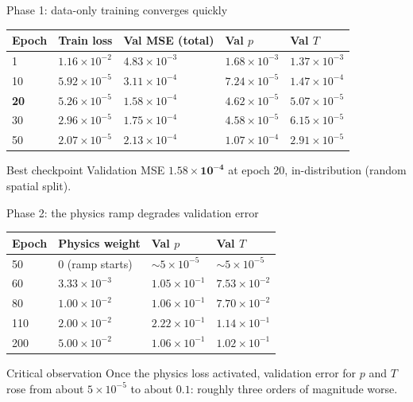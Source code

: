 \documentclass[aspectratio=169]{beamer}
\begin{document}
\begin{frame}{Phase 1: data-only training converges quickly}
\begin{center}
\small
\begin{tabular}{lllll}
\toprule
Epoch & Train loss & Val MSE (total) & Val $p$ & Val $T$ \\
\midrule
1  & $1.16\times10^{-2}$ & $4.83\times10^{-3}$ & $1.68\times10^{-3}$ & $1.37\times10^{-3}$ \\
10 & $5.92\times10^{-5}$ & $3.11\times10^{-4}$ & $7.24\times10^{-5}$ & $1.47\times10^{-4}$ \\
\textbf{20} & \textbf{$5.26\times10^{-5}$} & \textbf{$1.58\times10^{-4}$} & \textbf{$4.62\times10^{-5}$} & \textbf{$5.07\times10^{-5}$} \\
30 & $2.96\times10^{-5}$ & $1.75\times10^{-4}$ & $4.58\times10^{-5}$ & $6.15\times10^{-5}$ \\
50 & $2.07\times10^{-5}$ & $2.13\times10^{-4}$ & $1.07\times10^{-4}$ & $2.91\times10^{-5}$ \\
\bottomrule
\end{tabular}
\end{center}
\vspace{0.2cm}
\begin{block}{Best checkpoint}
Validation MSE $\mathbf{1.58\times10^{-4}}$ at epoch 20, in-distribution (random spatial split).
\end{block}
\end{frame}

\begin{frame}{Phase 2: the physics ramp degrades validation error}
\begin{center}
\small
\begin{tabular}{llll}
\toprule
Epoch & Physics weight & Val $p$ & Val $T$ \\
\midrule
50  & 0 (ramp starts) & $\sim 5\times10^{-5}$ & $\sim 5\times10^{-5}$ \\
60  & $3.33\times10^{-3}$ & $1.05\times10^{-1}$ & $7.53\times10^{-2}$ \\
80  & $1.00\times10^{-2}$ & $1.06\times10^{-1}$ & $7.70\times10^{-2}$ \\
110 & $2.00\times10^{-2}$ & $2.22\times10^{-1}$ & $1.14\times10^{-1}$ \\
200 & $5.00\times10^{-2}$ & $1.06\times10^{-1}$ & $1.02\times10^{-1}$ \\
\bottomrule
\end{tabular}
\end{center}
\vspace{0.2cm}
\begin{alertblock}{Critical observation}
Once the physics loss activated, validation error for $p$ and $T$ rose from about $5\times10^{-5}$ to about $0.1$: roughly three orders of magnitude worse.
\end{alertblock}
\end{frame}
\end{document}
